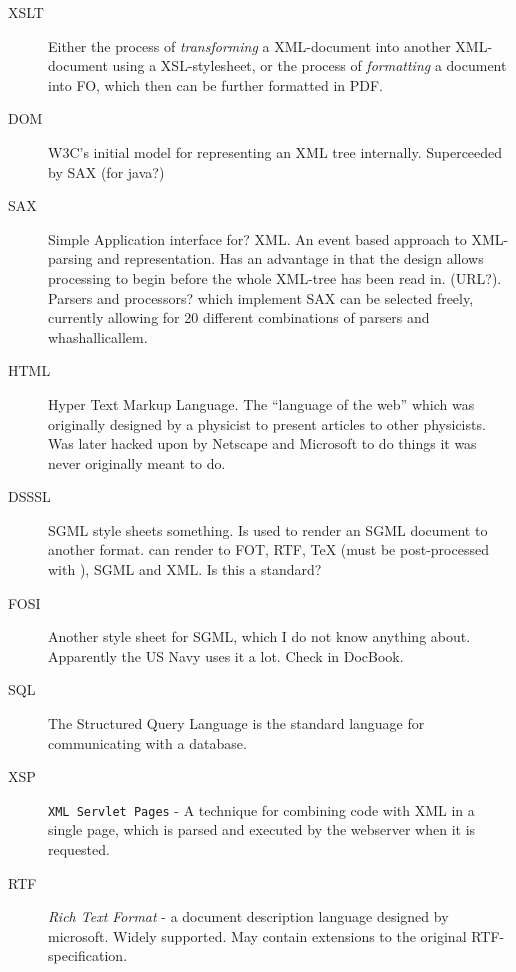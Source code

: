 \begin{description}
\item[XSLT] Either the process of \textit{transforming} a XML-document into
  another XML-document using a XSL-stylesheet, or the process of
  \textit{formatting} a document into FO, which then can be further
  formatted in PDF.

\item[DOM] \textsf{W3C's initial model for representing an XML tree
    internally.  Superceeded by SAX (\textsf{for java?)}}
  
\item[SAX] Simple Application \textsf{interface for?} XML.  An event
  based approach to XML-parsing and representation.  Has an advantage
  in that the design allows processing to begin before the whole
  XML-tree has been read in.  (\textsf{URL?}).  Parsers and
  \textsf{processors?} which implement SAX can be selected freely,
  currently allowing for \textsf{20 different combinations of parsers
    and whashallicallem}.


\item[HTML] Hyper Text Markup Language.  The ``language of the web''
  which was originally designed by a physicist to present articles to
  other physicists.  Was later hacked upon by Netscape and Microsoft
  to do things it was never originally meant to do.

  
\item[DSSSL] \textsf{SGML style sheets something}.  Is used to render
  an SGML document to another format.   can render
  to \textsf{FOT}, RTF, {\TeX} (must be post-processed with
  ), SGML and XML.  \textsf{Is this a standard?}
  
\item[FOSI]  \textsf{Another style sheet for SGML}, which I do
  not know anything about.  Apparently the US Navy uses it a lot.
\textsf{  Check in DocBook.}

  
\item[SQL] The Structured Query Language is the \textsf{standard}
  language for communicating with a database.

  
\item[XSP] \texttt{XML Servlet Pages} - A technique for combining code
  with XML in a single page, which is parsed and executed by the
  webserver when it is requested.

\item[RTF] \textit{Rich Text Format} - a document description language
\textsf{designed by microsoft}.  Widely supported.  May contain
extensions to the original RTF-specification.


\end{description}
